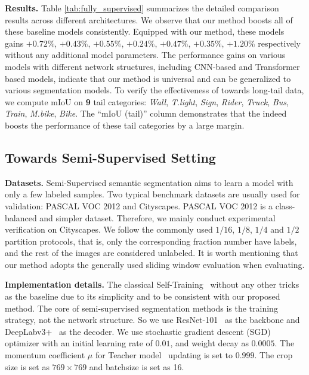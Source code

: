 \noindent\textbf{Results.} 
Table \cref{tab:fully_supervised} summarizes the detailed comparison results across different architectures.
%
We observe that our method boosts all of these baseline models consistently.
%
Equipped with our method, these models gains $+0.72\%$, $+0.43\%$, $+0.55\%$, $+0.24\%$, $+0.47\%$, $+0.35\%$, $+1.20\%$ respectively without any additional model parameters.
%
The performance gains on various models with different network structures, including CNN-based and Transformer based models, indicate that our method is universal and can be generalized to various segmentation models.
%
To verify the effectiveness of \method towards long-tail data, we compute mIoU on \textbf{9} tail categories: \textit{Wall}, \textit{T.light}, \textit{Sign}, \textit{Rider}, \textit{Truck}, \textit{Bus}, \textit{Train}, \textit{M.bike}, \textit{Bike}.
%
The ``mIoU (tail)'' column demonstrates that the \method indeed boosts the performance of these tail categories by a large margin.

\subsection{Towards Semi-Supervised Setting}\label{sec:semi_exp}
\noindent\textbf{Datasets.} Semi-Supervised semantic segmentation aims to learn a model with only a few labeled samples.
%
Two typical benchmark datasets are usually used for validation: PASCAL VOC 2012\cite{voc} and Cityscapes\cite{cityscapes}.
%
PASCAL VOC 2012 is a class-balanced and simpler dataset.
%
Therefore, we mainly conduct experimental verification on Cityscapes.
%
We follow the commonly used $1/16$, $1/8$, $1/4$ and $1/2$ partition protocols, that is, only the corresponding fraction number have labels, and the rest of the images are considered unlabeled.
%
It is worth mentioning that our method adopts the generally used sliding window evaluation when evaluating.
%

%
\noindent\textbf{Implementation details.} The classical Self-Training~\cite{amini2022self} without any other tricks as the baseline due to its simplicity and to be consistent with our proposed method.
%
The core of semi-supervised segmentation methods is the training strategy, not the network structure.
%
So we use ResNet-101~\cite{he2016deep} as the backbone and DeepLabv3+~\cite{deeplab} as the decoder.
%
We use stochastic gradient descent (SGD) optimizer with an initial learning rate of $0.01$, and weight decay as $0.0005$.
%
The momentum coefficient $\mu$ for Teacher model~\cite{tarvainen2017mean} updating is set to $0.999$.
%
The crop size is set as $769\times 769$ and batchsize is set as 16.

